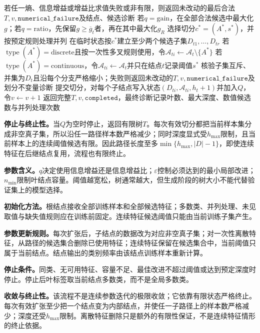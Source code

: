 \begin{AlgorithmContract}
\begin{algorithm}[H]
{  若任一熵、信息增益或增益比求值失败或非有限，则返回未改动的最后合法$T,v,\mathtt{numerical\_failure}$及结点、候选诊断\;
  若$q=\mathrm{gain}$，在全部合法候选中最大化$g$；若$q=\mathrm{ratio}$，先保留$g\geq\overline g_t$者，再在其中最大化$g_R$
  选择切分$c^*=(A^*,s^*)$，并按预定规则处理并列
  在临时状态按$c^*$建立至少两个候选子集$D_{t1},\ldots,D_{tr}$
  若$\operatorname{type}(A^*)=\mathrm{discrete}$且按一次性多叉规则使用，令$\mathcal A_{ti}\leftarrow\mathcal A_t\setminus\{A^*\}$
  若$\operatorname{type}(A^*)=\mathrm{continuous}$，令$\mathcal A_{ti}\leftarrow\mathcal A_t$并只在结点$t$记录阈值$s^*$
  核验子集互斥、并集为$D_t$且沿每个分支严格缩小；失败则返回未改动的$T,v,\mathtt{numerical\_failure}$及划分不变量诊断\;
  提交切分，对每个子结点写入状态$(D_{ti},\mathcal A_{ti},h_t+1)$并加入$Q$，令$v\leftarrow v+1$
}
返回完整$T,v,\mathtt{completed}$，最终诊断记录叶数、最大深度、数值候选数与并列处理次数\;
\end{algorithm}
\end{AlgorithmContract}

\noindent\textbf{停止与终止性。}当$Q$为空时停止，返回有限树$T$。每次有效切分都把当前样本集分成非空真子集，所以沿任一路径样本数严格减少；同时深度显式受$h_{\max}$限制，且当前样本上的连续阈值候选有限。因此路径长度至多$\min\{h_{\max},|D|-1\}$，即使连续特征在后继结点复用，流程也有限终止。

\label{struct:V2-C04-CH21}
\textbf{参数含义。}$q$决定使用信息增益还是信息增益比；$\varepsilon$控制必须达到的最小局部改进；$n_{\min}$限制叶结点容量。阈值越宽松，树通常越大，但生成阶段的树大小不能代替验证集上的模型选择。

\label{struct:V2-C04-CH22}
\textbf{初始化方法。}根结点接收全部训练样本和全部候选特征；多数类、并列处理、未见取值与缺失值规则应在训练前固定。连续特征候选阈值只能由当前训练子集产生。

\label{struct:V2-C04-CH23}
\textbf{参数更新规则。}每次扩张后，子结点的数据改为对应非空真子集；对一次性离散特征，从路径的候选集合删除已使用特征；连续特征保留在候选集合中，当前阈值只属于当前结点。结点输出的类别频率由该结点训练样本重新计算。

\label{struct:V2-C04-CH24}
\textbf{停止条件。}同类、无可用特征、容量不足、最佳改进不超过阈值或达到预定深度时停止。停止后叶标签取当前结点多数类，而不是全局多数类。

\label{struct:V2-C04-CH25}
\textbf{收敛与终止性。}该流程不是连续参数迭代的极限收敛；它依靠有限状态严格终止。每次有效扩张至少把一个结点变为内部结点，并使任一子路径上的样本数严格减少；深度还受$h_{\max}$限制。离散特征删除只是额外的有限性保证，不是连续特征情形的终止依据。


